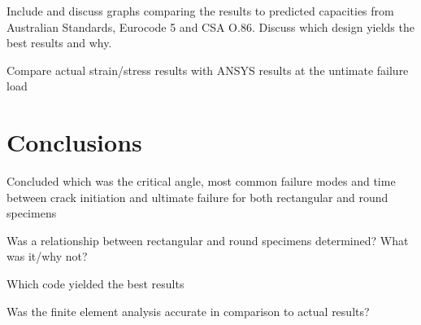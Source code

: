 \documentclass[11pt,a4paper]{article}
\numberwithin{equation}{subsection}
\begin{document}
\vspace*{\baselineskip}
\noindent Include and discuss graphs comparing the results to predicted capacities from Australian Standards, Eurocode 5 and CSA O.86. Discuss which design yields the best results and why. \par

\vspace*{\baselineskip}
\noindent Compare actual strain/stress results with ANSYS results at the untimate failure load\par

\pagebreak	


\section{Conclusions}
\vspace*{\baselineskip}
\noindent Concluded which was the critical angle, most common failure modes and time between crack initiation and ultimate failure for both rectangular and round specimens\par

\vspace*{\baselineskip}
\noindent Was a relationship between rectangular and round specimens determined? What was it/why not?\par

\vspace*{\baselineskip}
\noindent Which code yielded the best results\par

\vspace*{\baselineskip}
\noindent Was the finite element analysis accurate in comparison to actual results?\par

\pagebreak	




\pagebreak
\cleardoublepage
{}

\appendixtitleon
\end{document}
